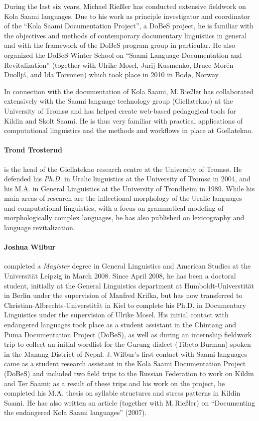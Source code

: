\documentclass[a4paper,12pt]{article}
\begin{document}
{{During the last six years, Michael Rießler has conducted extensive fieldwork on Kola Saami languages. Due to his work as principle investigator and coordinator of the “Kola Saami Documentation Project”, a DoBeS project, he is familiar with the objectives and methods of contemporary documentary linguistics in general and with the framework of the DoBeS program group in particular. He also organized the DoBeS Winter School on “Saami Language Documentation and Revitalization” (together with Ulrike Mosel, Jurij Kusmenko, Bruce Morén-Duolljá, and Ida Toivonen) which took place in 2010 in Bodø, Norway.

In connection with the documentation of Kola Saami, M.\,Rießler has collaborated extensively with the Saami language technology group (Giellatekno) at the University of Tromsø and has helped create web-based pedagogical tools for Kildin and Skolt Saami. He is thus very familiar with practical applications of computational linguistics and the methods and workflows in place at Giellatekno.

\paragraph{Trond Trosterud} is the head of the Giellatekno research centre at the University of Tromsø. He defended his \textit{Ph.D.} in Uralic linguistics at the University of Tromsø in 2004, and his M.A. in General Linguistics at the University of Trondheim in 1989. While his main areas of research are the inflectional morphology of the Uralic languages and computational linguistics, with a focus on grammatical modeling of morphologically complex languages, he has also published on lexicography and language revitalization.

\paragraph{Joshua Wilbur} completed a \textit{Magister} degree in General Linguistics and American Studies at the Universität Leipzig in March 2008. Since April 2008, he has been a doctoral student, initially at the General Linguistics department at Humboldt-Universtität in Berlin under the supervision of Manfred Krifka, but has now transferred to Christian-Albrechts-Universtität in Kiel to complete his Ph.D. in Documentary Linguistics under the supervision of Ulrike Mosel. His initial contact with endangered languages took place as a student assistant in the Chintang and Puma Documentation Project (DoBeS), as well as during an internship fieldwork trip to collect an initial wordlist for the Gurung dialect (Tibeto-Burman) spoken in the Manang District of Nepal. J.\,Wilbur's first contact with Saami languages came as a student research assistant in the Kola Saami Documentation Project (DoBeS) and included two field trips to the Russian Federation to work on Kildin and Ter Saami; as a result of these trips and his work on the project, he completed his M.A. thesis on syllable structures and stress patterns in Kildin Saami. He has also written an article (together with M.\,Rießler) on “Documenting the endangered {K}ola {S}aami languages” (2007).

}}
\end{document}
